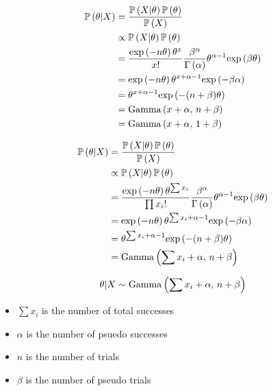 \documentclass[12pt]{article}
\begin{document}
\begin{enumerate}
\begin{align*}
    \mathbb{P}\left(\theta|X\right) &= \frac{\mathbb{P}\left(X|\theta\right)\mathbb{P}\left(\theta\right)}{\mathbb{P}\left(X\right)} \\
                    &\propto \mathbb{P}\left(X|\theta\right)\mathbb{P}\left(\theta\right) \\ 
                    &= \frac{\mathrm{exp}\left(-n\theta\right)\theta^{x}}{x!}\frac{\beta^\alpha}{\Gamma\left(\alpha\right)} \theta^{\alpha-1}\mathrm{exp}\left(\beta\theta\right) \\
                    &= \mathrm{exp}\left(-n\theta\right)\theta^{x+\alpha-1}\mathrm{exp}\left(-\beta\alpha\right) \\
                    &= \theta^{x+\alpha-1}\mathrm{exp}\left(-(n+\beta)\theta\right) \\
                    &= \mathrm{Gamma}\left(x+\alpha,\,n+\beta\right) \\ 
                    &= \mathrm{Gamma}\left(x+\alpha,\,1+\beta\right)
\end{align*}


\begin{align*}
    \mathbb{P}\left(\theta|X\right) &= \frac{\mathbb{P}\left(X|\theta\right)\mathbb{P}\left(\theta\right)}{\mathbb{P}\left(X\right)} \\
                    &\propto \mathbb{P}\left(X|\theta\right)\mathbb{P}\left(\theta\right) \\ 
                    &= \frac{\mathrm{exp}\left(-n\theta\right)\theta^{\sum{x_i}}}{\prod{x_i!}}\frac{\beta^\alpha}{\Gamma\left(\alpha\right)} \theta^{\alpha-1}\mathrm{exp}\left(\beta\theta\right) \\
                    &= \mathrm{exp}\left(-n\theta\right)\theta^{\sum{x_i}+\alpha-1}\mathrm{exp}\left(-\beta\alpha\right) \\
                    &= \theta^{\sum{x_i}+\alpha-1}\mathrm{exp}\left(-(n+\beta)\theta\right) \\
                    &= \mathrm{Gamma}\left(\sum{x_i}+\alpha,\,n+\beta\right)
\end{align*}



\begin{align*}
    \theta|X \sim \mathrm{Gamma}\left(\sum{x_i}+\alpha,\,n+\beta\right) 
\end{align*}

\begin{itemize}
    \item $\sum{x_i}$ is the number of total successes
    \item $\alpha$  is the number of psuedo successes
    \item $n$ is the number of trials
    \item $\beta$ is the number of pseudo trials
\end{itemize}


\end{enumerate}
\end{document}

